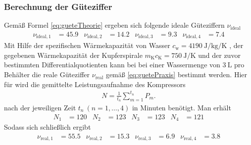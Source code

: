 \subsubsection[]{Berechnung der Güteziffer}
Gemäß Formel \eqref{eq:gueteTheorie} ergeben sich folgende ideale Güteziffern $\nu_\text{ideal}$
\begin{align*}
    \nu_{\text{ideal}, 1} &= 45.9 & \nu_{\text{ideal}, 2} &=14.2 & \nu_{\text{ideal}, 3} &= 9.3 & \nu_{\text{ideal}, 4} &= 7.4
\end{align*}
Mit Hilfe der spezifischen Wärmekapazität von Wasser $c_{\text{w}} = \qty{4190}{\joule\per\kg\per\kelvin}$ \cite[]{leifi}, der gegebenen Wärmekapazität
der Kupferspirale $m_{\text{K}} c_{\text{K}} = \qty{750}{\joule\per\kelvin}$ und der zuvor bestimmten Differentialquotienten
kann bei bei einer Wassermenge von $\qty[]{3}{\liter}$ pro Behälter die reale Güteziffer $\nu_{\text{real}}$ gemäß \eqref{eq:guetePraxis} bestimmt werden.
Hier für wird die gemittelte Leistungsaufnahme des Kompressors
\begin{align*}
    N = \frac{1}{t_n} \sum_{m=1}^{t_n} P_m.
\end{align*}
nach der jeweiligen Zeit $t_n \ \left(n = 1, \dotsc, 4\right)$ in Minuten benötigt.
Man erhält
\begin{align*}
    N_1  &=  120 &
    N_2  &=  123 &
    N_3  &=  123 &
    N_4  &=  121
\end{align*}
Sodass sich schließlich ergibt
\begin{align*}
    \nu_{\text{real}, 1} &= 55.5 & \nu_{\text{real}, 2} &= 15.3 & \nu_{\text{real}, 3} &= 6.9 & \nu_{\text{real}, 4} &= 3.8  
\end{align*}
%
